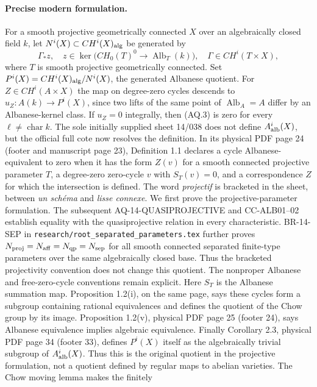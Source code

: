 \paragraph{Precise modern formulation.}
For a smooth projective geometrically connected $X$ over an
algebraically closed field $k$, let $N^i(X)\subset CH^i(X)_{\rm alg}$
be generated by
\[
 \Gamma_*z,\quad
 z\in\ker\bigl(CH_0(T)^0\longrightarrow\operatorname{Alb}_T(k)\bigr),
 \quad\Gamma\in CH^i(T\times X),                                \tag{AQ.4}
\]
where $T$ is smooth projective geometrically connected.
Set $P^i(X)=CH^i(X)_{\rm alg}/N^i(X)$, the generated Albanese
quotient. For $Z\in CH^i(A\times X)$
the map on degree-zero cycles descends to
$u_Z:A(k)\to P^i(X)$, since two lifts of the same point of
$\operatorname{Alb}_A=A$ differ by an Albanese-kernel class.
If $u_Z=0$ integrally, then (AQ.3) is zero for every
$\ell\ne\operatorname{char}k$.
The sole initially supplied sheet 14/038 does not define
$A^i_{\rm alb}(X)$, but the official full cote now resolves
the definition. In its physical PDF page 24 (footer and
manuscript page 23), Definition 1.1 declares a cycle
Albanese-equivalent to zero when it has the form
$Z(v)$ for a smooth connected projective parameter $T$,
a degree-zero zero-cycle $v$ with $S_T(v)=0$, and a
correspondence $Z$ for which the intersection is defined.
The word \emph{projectif} is bracketed in the sheet,
between \emph{un sch\'ema} and \emph{lisse connexe}.
We first prove the projective-parameter formulation.
The subsequent AQ-14-QUASIPROJECTIVE and CC-ALB01--02
establish equality with the quasiprojective relation in every
characteristic. BR-14-SEP in
\texttt{research/root\_separated\_parameters.tex} further proves
$N_{\rm proj}=N_{\rm aff}=N_{\rm qp}=N_{\rm sep}$ for all
smooth connected separated finite-type parameters over the same
algebraically closed base. Thus the bracketed projectivity
convention does not change this quotient. The nonproper
Albanese and free-zero-cycle conventions remain explicit.
Here $S_T$ is the Albanese summation map.
Proposition 1.2(i), on the same page, says these cycles
form a subgroup containing rational equivalences and
defines the quotient of the Chow group by its image.
Proposition 1.2(v), physical PDF page 25 (footer 24),
says Albanese equivalence implies algebraic equivalence.
Finally Corollary 2.3, physical PDF page 34 (footer 33),
defines $P^i(X)$ itself as the algebraically trivial
subgroup of $A^i_{\rm alb}(X)$. Thus this is the
original quotient in the projective formulation,
not a quotient defined by regular maps to abelian
varieties. The Chow moving lemma makes the finitely
